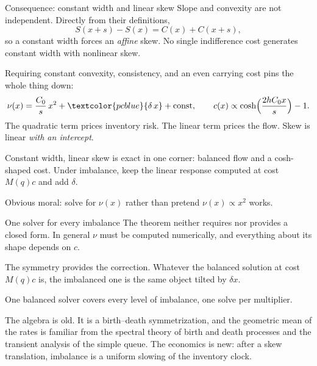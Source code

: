 \documentclass[10pt]{beamer}
\newcommand{\blue}[1]{\textcolor{pcblue}{#1}}
\begin{document}
\begin{frame}{Consequence: constant width and linear skew}
Slope and convexity are not independent. Directly from their definitions,
\begin{equation}
S(x+s) - S(x) = C(x) + C(x+s),
\end{equation}
so a constant width forces an \emph{affine} skew. No single indifference cost generates constant width with nonlinear skew.
\vspace{1em}

Requiring constant convexity, consistency, and an even carrying cost pins the whole thing down:
\[
\nu(x) = \frac{C_0}{s}\,x^2 + \blue{\delta\,x} + \text{const}, \qquad c(x) \propto \cosh\!\Big(\frac{2hC_0 x}{s}\Big) - 1 .
\]
The quadratic term prices inventory risk. The linear term prices the flow. Skew is linear \emph{with an intercept}.
\vspace{1em}

Constant width, linear skew is exact in one corner: balanced flow and a cosh-shaped cost. Under imbalance, keep the linear response computed at cost $M(q)c$ and add $\delta$.
\vspace{0.5em}

Obvious moral: solve for $\nu(x)$ rather than pretend $\nu(x) \propto x^2$ works.
\end{frame}

\begin{frame}{One solver for every imbalance}
The theorem neither requires nor provides a closed form. In general $\nu$ must be computed numerically, and everything about its shape depends on $c$.
\vspace{1em}

The symmetry provides the correction. Whatever the balanced solution at cost $M(q)c$ is, the imbalanced one is the same object tilted by $\delta x$.
\vspace{1em}

\blue{One balanced solver covers every level of imbalance}, one solve per multiplier.
\vspace{1em}

The algebra is old. It is a birth--death symmetrization, and the geometric mean of the rates is familiar from the spectral theory of birth and death processes and the transient analysis of the simple queue. The economics is new: after a skew translation, imbalance is a uniform slowing of the inventory clock.
\end{frame}

\end{document}
